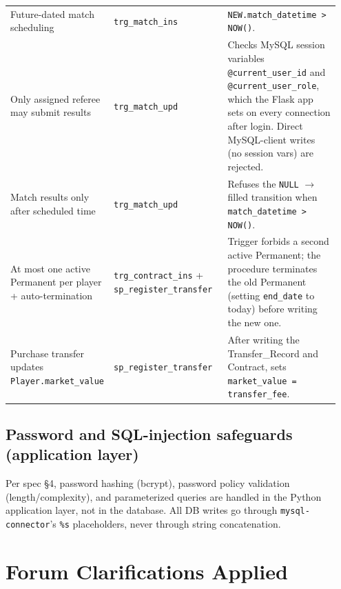 \documentclass[11pt]{article}
\begin{document}
\begin{longtable}{@{}p{0.25\linewidth}p{0.35\linewidth}p{0.35\linewidth}@{}}
Future-dated match scheduling &
  \texttt{trg\_match\_ins} &
  \texttt{NEW.match\_datetime > NOW()}. \\

Only assigned referee may submit results &
  \texttt{trg\_match\_upd} &
  Checks MySQL session variables \texttt{@current\_user\_id} and
  \texttt{@current\_user\_role}, which the Flask app sets on every
  connection after login. Direct MySQL-client writes (no session vars)
  are rejected. \\

Match results only after scheduled time &
  \texttt{trg\_match\_upd} &
  Refuses the \texttt{NULL} $\to$ filled transition when
  \texttt{match\_datetime > NOW()}. \\

At most one active Permanent per player + auto-termination &
  \texttt{trg\_contract\_ins} + \texttt{sp\_register\_transfer} &
  Trigger forbids a second active Permanent; the procedure terminates
  the old Permanent (setting \texttt{end\_date} to today) before
  writing the new one. \\

Purchase transfer updates \texttt{Player.market\_value} &
  \texttt{sp\_register\_transfer} &
  After writing the Transfer\_Record and Contract, sets
  \texttt{market\_value = transfer\_fee}. \\

\bottomrule
\end{longtable}

\subsection{Password and SQL-injection safeguards (application layer)}

Per spec \S 4, password hashing (bcrypt), password policy validation
(length/complexity), and parameterized queries are handled in the
Python application layer, not in the database. All DB writes go through
\texttt{mysql-connector}'s \texttt{\%s} placeholders, never through
string concatenation.

\section{Forum Clarifications Applied}
\end{document}
